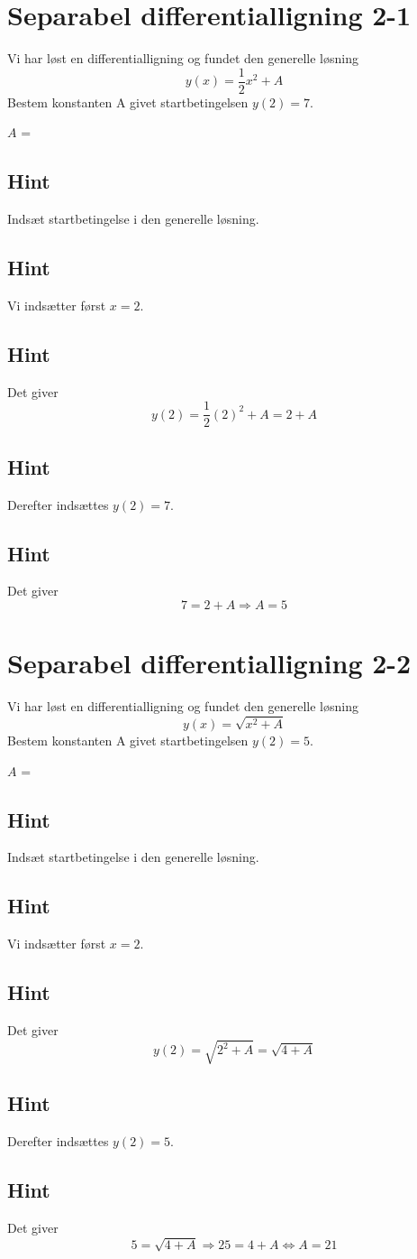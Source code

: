 \documentclass{article}
\newenvironment{exercise}[1]{\newpage\section{#1}}{}
\newcommand{\answerbox}[1]{\fbox{$#1$}}
\newcommand{\hint}{\subsection*{Hint}}
\begin{document}
\tableofcontents

\newpage

\begin{exercise}{Separabel differentialligning 2-1}

	
	Vi har løst en differentialligning og fundet den generelle løsning
	\[
	y(x) = \frac{1}{2}x^2 + A
	\]
	Bestem konstanten A givet startbetingelsen $y(2)=7$.
	
	$A$ = \answerbox{5}
	
	\hint
	
	Indsæt startbetingelse i den generelle løsning. 

	
	\hint
	
	Vi indsætter først $x=2$.
	
	\hint
	
	Det giver
	\[
	y(2)= \frac{1}{2}(2)^2+A = 2 + A
	\]
	
	\hint
	
	Derefter indsættes $y(2)=7$.

	\hint 
	
	Det giver 
		\[
	7 = 2 + A \Rightarrow A = 5
	\]
	
\end{exercise}

\newpage

\begin{exercise}{Separabel differentialligning 2-2}

	
	Vi har løst en differentialligning og fundet den generelle løsning
	\[
	y(x) = \sqrt{x^2 + A}
	\]
	Bestem konstanten A givet startbetingelsen $y(2)=5$.
	
	$A$ = \answerbox{21}
	
	\hint
	
	Indsæt startbetingelse i den generelle løsning. 
	
	
	\hint
	
	Vi indsætter først $x=2$.
	
	\hint
	
	Det giver
	\[
	y(2)= \sqrt{2^2 + A} = \sqrt{4 + A}
	\]
	
	\hint
	
	Derefter indsættes $y(2)=5$.
	
	\hint 
	
	Det giver 
	\[
	5 = \sqrt{4 + A} \Rightarrow 25 = 4 + A \Leftrightarrow A = 21	
	\]
	
\end{exercise}

\newpage
\end{document}
